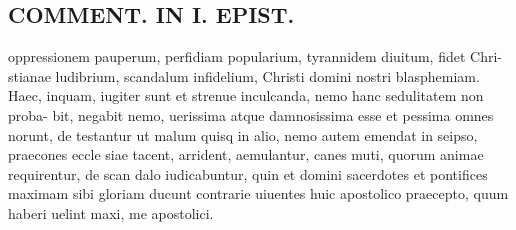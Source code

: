 \documentclass{article}
\begin{document}
\begin{pages}
\section*{COMMENT. IN I. EPIST. }
\marginpar{[ p.534 ]}\pstart oppressionem pauperum, perfidiam popularium, tyrannidem diuitum, fidet Chri- stianae ludibrium, scandalum infidelium, Christi domini nostri blasphemiam. Haec, inquam, iugiter sunt et strenue inculcanda, nemo hanc sedulitatem non proba- bit, negabit nemo, uerissima atque damnosissima esse et pessima omnes norunt, de testantur ut malum quisq in alio, nemo autem emendat in seipso, praecones eccle siae tacent, arrident, aemulantur, canes muti, quorum animae requirentur, de scan dalo iudicabuntur, quin et domini sacerdotes et pontifices maximam sibi gloriam ducunt contrarie uiuentes huic apostolico praecepto, quum haberi uelint maxi, me apostolici.  \pend
{}
{}

\end{pages}
\end{document}
